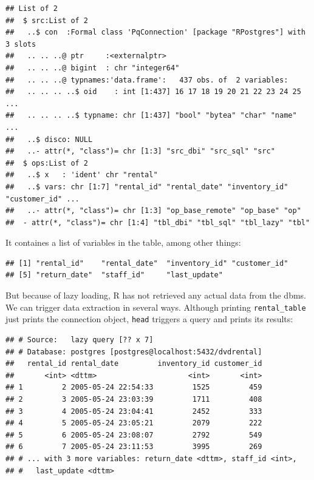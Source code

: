 \documentclass[]{book}
\newenvironment{Shaded}{\begin{snugshade}}{\end{snugshade}}
\newcommand{\NormalTok}[1]{#1}
\newcommand{\OperatorTok}[1]{\textcolor[rgb]{0.81,0.36,0.00}{\textbf{#1}}}
\newcommand{\StringTok}[1]{\textcolor[rgb]{0.31,0.60,0.02}{#1}}
\theoremstyle{definition}
\theoremstyle{definition}
\theoremstyle{definition}
\theoremstyle{remark}
\begin{document}
\begin{verbatim}
## List of 2
##  $ src:List of 2
##   ..$ con  :Formal class 'PqConnection' [package "RPostgres"] with 3 slots
##   .. .. ..@ ptr     :<externalptr> 
##   .. .. ..@ bigint  : chr "integer64"
##   .. .. ..@ typnames:'data.frame':   437 obs. of  2 variables:
##   .. .. .. ..$ oid    : int [1:437] 16 17 18 19 20 21 22 23 24 25 ...
##   .. .. .. ..$ typname: chr [1:437] "bool" "bytea" "char" "name" ...
##   ..$ disco: NULL
##   ..- attr(*, "class")= chr [1:3] "src_dbi" "src_sql" "src"
##  $ ops:List of 2
##   ..$ x   : 'ident' chr "rental"
##   ..$ vars: chr [1:7] "rental_id" "rental_date" "inventory_id" "customer_id" ...
##   ..- attr(*, "class")= chr [1:3] "op_base_remote" "op_base" "op"
##  - attr(*, "class")= chr [1:4] "tbl_dbi" "tbl_sql" "tbl_lazy" "tbl"
\end{verbatim}

It containes a list of variables in the table, among other things:

\begin{Shaded}
\end{Shaded}

\begin{verbatim}
## [1] "rental_id"    "rental_date"  "inventory_id" "customer_id" 
## [5] "return_date"  "staff_id"     "last_update"
\end{verbatim}

But because of lazy loading, R has not retrieved any actual data from
the dbms. We can trigger data extraction in several ways. Although
printing \texttt{rental\_table} just prints the connection object,
\texttt{head} triggers a query and prints its results:

\begin{Shaded}
\end{Shaded}

\begin{verbatim}
## # Source:   lazy query [?? x 7]
## # Database: postgres [postgres@localhost:5432/dvdrental]
##   rental_id rental_date         inventory_id customer_id
##       <int> <dttm>                     <int>       <int>
## 1         2 2005-05-24 22:54:33         1525         459
## 2         3 2005-05-24 23:03:39         1711         408
## 3         4 2005-05-24 23:04:41         2452         333
## 4         5 2005-05-24 23:05:21         2079         222
## 5         6 2005-05-24 23:08:07         2792         549
## 6         7 2005-05-24 23:11:53         3995         269
## # ... with 3 more variables: return_date <dttm>, staff_id <int>,
## #   last_update <dttm>
\end{verbatim}
\end{document}
